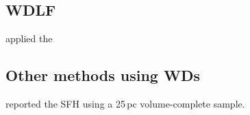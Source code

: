 \documentclass[fleqn,usenatbib]{mnras}
\begin{document}
\subsection{WDLF}
\citet{2013MNRAS.434.1549R} applied the 


\subsection{Other methods using WDs}
\citet{2014ApJ...791...92T} reported the SFH using a 25\,pc volume-complete
sample. 



\end{document}
